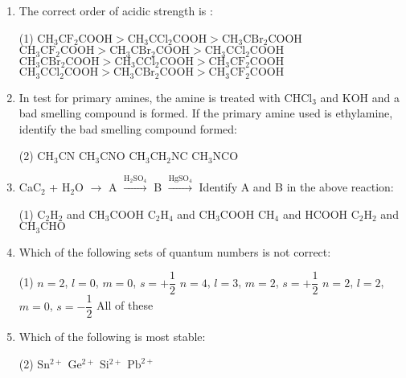 \documentclass[twocolumn]{article}
\renewcommand{\frac}[2]{\dfrac{#1}{#2}}
\begin{document}
\begin{enumerate}
    \item The correct order of acidic strength is :
    \begin{tasks}(1)
        \task \( \mathrm{CH_3CF_2COOH > CH_3CCl_2COOH > CH_3CBr_2COOH} \)
        \task \( \mathrm{CH_3CF_2COOH > CH_3CBr_2COOH > CH_3CCl_2COOH} \)
        \task \( \mathrm{CH_3CBr_2COOH > CH_3CCl_2COOH > CH_3CF_2COOH} \)
        \task \( \mathrm{CH_3CCl_2COOH > CH_3CBr_2COOH > CH_3CF_2COOH} \)
    \end{tasks}
    
    \item In test for primary amines, the amine is treated with CHCl\(_3\) and KOH and a bad smelling compound is formed. If the primary amine used is ethylamine, identify the bad smelling compound formed:
    \begin{tasks}(2)
        \task \( \mathrm{CH_3CN} \)
        \task \( \mathrm{CH_3CNO} \)
        \task \( \mathrm{CH_3CH_2NC} \)
        \task \( \mathrm{CH_3NCO} \)
    \end{tasks}
    
    \item CaC\(_2\) + H\(_2\)O \(\rightarrow\) A \( \overset{\mathrm{H_2SO_4}}{\rightarrow} \) B \( \overset{\mathrm{HgSO_4}}{\rightarrow} \)
    Identify A and B in the above reaction:
    \begin{tasks}(1)
        \task \( \mathrm{C_2H_2} \) and \( \mathrm{CH_3COOH} \)
        \task \( \mathrm{C_2H_4} \) and \( \mathrm{CH_3COOH} \)
        \task \( \mathrm{CH_4} \) and \( \mathrm{HCOOH} \)
        \task \( \mathrm{C_2H_2} \) and \( \mathrm{CH_3CHO} \)
    \end{tasks}

    \item Which of the following sets of quantum numbers is not correct:
    \begin{tasks}(1)
        \task \( n = 2 \), \( l = 0 \), \( m = 0 \), \( s = +\frac{1}{2} \)
        \task \( n = 4 \), \( l = 3 \), \( m = 2 \), \( s = +\frac{1}{2} \)
        \task \( n = 2 \), \( l = 2 \), \( m = 0 \), \( s = -\frac{1}{2} \)
        \task All of these
    \end{tasks}
    
    \item Which of the following is most stable:
    \begin{tasks}(2)
        \task \( \mathrm{Sn^{2+}} \)
        \task \( \mathrm{Ge^{2+}} \)
        \task \( \mathrm{Si^{2+}} \)
        \task \( \mathrm{Pb^{2+}} \)
    \end{tasks}
    

\end{enumerate}
\end{document}
